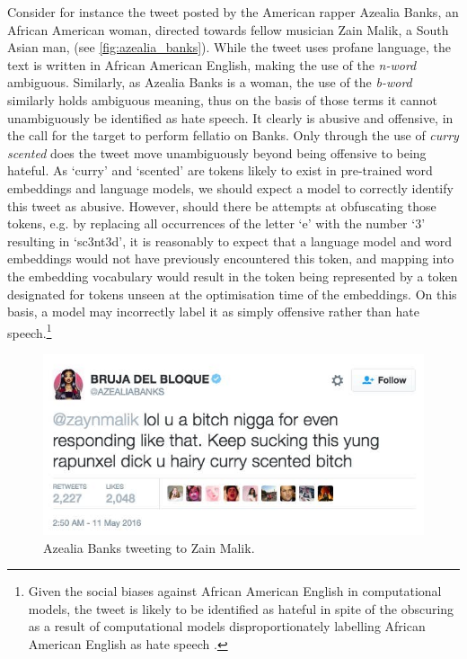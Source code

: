 Consider for instance the tweet posted by the American rapper Azealia Banks, an African American woman, directed towards fellow musician Zain Malik, a South Asian man, (see \autoref{fig:azealia_banks}). While the tweet uses profane language, the text is written in African American English, making the use of the \textit{n-word} ambiguous. Similarly, as Azealia Banks is a woman, the use of the \textit{b-word} similarly holds ambiguous meaning, thus on the basis of those terms it cannot unambiguously be identified as hate speech. It clearly is abusive and offensive, in the call for the target to perform fellatio on Banks. Only through the use of \textit{curry scented} does the tweet move unambiguously beyond being offensive to being hateful. As `curry' and `scented' are tokens likely to exist in pre-trained word embeddings and language models, we should expect a model to correctly identify this tweet as abusive. However, should there be attempts at obfuscating those tokens, e.g. by replacing all occurrences of the letter `e' with the number `$3$' resulting in `sc3nt3d', it is reasonably to expect that a language model and word embeddings would not have previously encountered this token, and mapping into the embedding vocabulary would result in the token being represented by a token designated for tokens unseen at the optimisation time of the embeddings. On this basis, a model may incorrectly label it as simply offensive rather than hate speech.\footnote{Given the social biases against African American English in computational models, the tweet is likely to be identified as hateful in spite of the obscuring as a result of computational models disproportionately labelling African American English as hate speech \citep{Davidson:2019}.}

\begin{figure}[h]
  \centering
  \includegraphics[scale=0.5]{Azealia_banks.jpeg}
  \caption{Azealia Banks tweeting to Zain Malik.}
  \label{fig:azealia_banks}
\end{figure}

